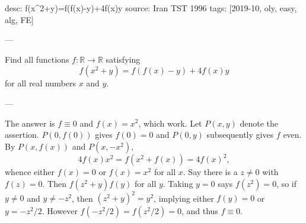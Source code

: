 desc: f(x^2+y)=f(f(x)-y)+4f(x)y
source: Iran TST 1996
tags: [2019-10, oly, easy, alg, FE]

---

Find all functions $f:\mathbb R\to\mathbb R$ satisfying \[f(x^2+y)=f(f(x)-y)+4f(x)y\]
for all real numbers $x$ and $y$.

---

The answer is $f\equiv0$ and $f(x)=x^2$, which work. Let $P(x,y)$ denote the assertion. $P(0,f(0))$ gives $f(0)=0$ and $P(0,y)$ subsequently gives $f$ even. By $P(x,f(x))$ and $P(x,-x^2)$, \[4f(x)x^2=f\left(x^2+f(x)\right)=4f(x)^2,\]
whence either $f(x)=0$ or $f(x)=x^2$ for all $x$. Say there is a $z\ne0$ with $f(z)=0$. Then $f(z^2+y)f(y)$ for all $y$. Taking $y=0$ says $f(z^2)=0$, so if $y\ne0$ and $y\ne-z^2$, then $(z^2+y)^2=y^2$, implying either $f(y)=0$ or $y=-z^2/2$. However $f(-z^2/2)=f(z^2/2)=0$, and thus $f\equiv0$.
